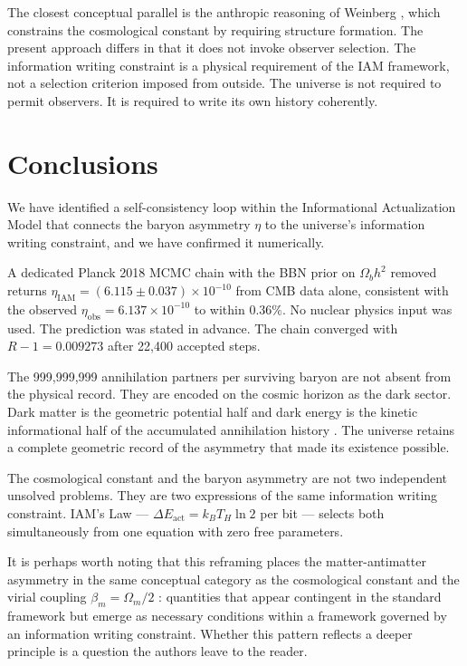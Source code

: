 \documentclass[12pt,a4paper]{article}
\begin{document}
The closest conceptual parallel is the anthropic reasoning of Weinberg
\citep{weinberg1989}, which constrains the cosmological constant by
requiring structure formation. The present approach differs in that it
does not invoke observer selection. The information writing constraint
is a physical requirement of the IAM framework, not a selection
criterion imposed from outside. The universe is not required to permit
observers. It is required to write its own history coherently.

\section{Conclusions}
\label{sec:conclusions}

We have identified a self-consistency loop within the Informational
Actualization Model that connects the baryon asymmetry $\eta$ to the
universe's information writing constraint, and we have confirmed it
numerically.

A dedicated Planck 2018 MCMC chain with the BBN prior on $\Omega_b h^2$
removed returns $\eta_\mathrm{IAM} = (6.115 \pm 0.037) \times 10^{-10}$
from CMB data alone, consistent with the observed
$\eta_\mathrm{obs} = 6.137 \times 10^{-10}$ to within $0.36\%$. No nuclear
physics input was used. The prediction was stated in advance.
The chain converged with $R - 1 = 0.009273$ after 22{,}400 accepted steps.

The 999,999,999 annihilation partners per surviving baryon are not
absent from the physical record. They are encoded on the cosmic horizon
as the dark sector. Dark matter is the geometric potential half and dark
energy is the kinetic informational half of the accumulated annihilation
history \citep{mahaffey2026_virial_dm}. The universe retains a complete
geometric record of the asymmetry that made its existence possible.

The cosmological constant and the baryon asymmetry are not two
independent unsolved problems. They are two expressions of the same
information writing constraint. IAM's Law — $\Delta E_\mathrm{act} = k_B
T_H \ln 2$ per bit — selects both simultaneously from one equation with
zero free parameters.

It is perhaps worth noting that this reframing places the
matter-antimatter asymmetry in the same conceptual category as the
cosmological constant \citep{mahaffey2026_cc} and the virial coupling
$\beta_m = \Omega_m/2$ \citep{mahaffey2026}: quantities that appear
contingent in the standard framework but emerge as necessary conditions
within a framework governed by an information writing constraint. Whether
this pattern reflects a deeper principle is a question the authors leave
to the reader.
\end{document}
